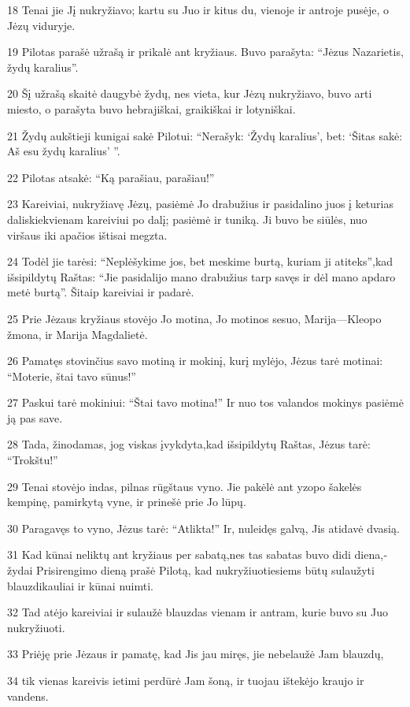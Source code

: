 \par 18 Tenai jie Jį nukryžiavo; kartu su Juo ir kitus du, vienoje ir antroje pusėje, o Jėzų viduryje. 
\par 19 Pilotas parašė užrašą ir prikalė ant kryžiaus. Buvo parašyta: “Jėzus Nazarietis, žydų karalius”. 
\par 20 Šį užrašą skaitė daugybė žydų, nes vieta, kur Jėzų nukryžiavo, buvo arti miesto, o parašyta buvo hebrajiškai, graikiškai ir lotyniškai. 
\par 21 Žydų aukštieji kunigai sakė Pilotui: “Nerašyk: ‘Žydų karalius’, bet: ‘Šitas sakė: Aš esu žydų karalius’ ”. 
\par 22 Pilotas atsakė: “Ką parašiau, parašiau!” 
\par 23 Kareiviai, nukryžiavę Jėzų, pasiėmė Jo drabužius ir pasidalino juos į keturias dalis­kiekvienam kareiviui po dalį; pasiėmė ir tuniką. Ji buvo be siūlės, nuo viršaus iki apačios ištisai megzta. 
\par 24 Todėl jie tarėsi: “Neplėšykime jos, bet meskime burtą, kuriam ji atiteks”,­kad išsipildytų Raštas: “Jie pasidalijo mano drabužius tarp savęs ir dėl mano apdaro metė burtą”. Šitaip kareiviai ir padarė. 
\par 25 Prie Jėzaus kryžiaus stovėjo Jo motina, Jo motinos sesuo, Marija—Kleopo žmona, ir Marija Magdalietė. 
\par 26 Pamatęs stovinčius savo motiną ir mokinį, kurį mylėjo, Jėzus tarė motinai: “Moterie, štai tavo sūnus!” 
\par 27 Paskui tarė mokiniui: “Štai tavo motina!” Ir nuo tos valandos mokinys pasiėmė ją pas save. 
\par 28 Tada, žinodamas, jog viskas įvykdyta,­kad išsipildytų Raštas, Jėzus tarė: “Trokštu!” 
\par 29 Tenai stovėjo indas, pilnas rūgštaus vyno. Jie pakėlė ant yzopo šakelės kempinę, pamirkytą vyne, ir prinešė prie Jo lūpų. 
\par 30 Paragavęs to vyno, Jėzus tarė: “Atlikta!” Ir, nuleidęs galvą, Jis atidavė dvasią. 
\par 31 Kad kūnai neliktų ant kryžiaus per sabatą,­nes tas sabatas buvo didi diena,­žydai Prisirengimo dieną prašė Pilotą, kad nukryžiuotiesiems būtų sulaužyti blauzdikauliai ir kūnai nuimti. 
\par 32 Tad atėjo kareiviai ir sulaužė blauzdas vienam ir antram, kurie buvo su Juo nukryžiuoti. 
\par 33 Priėję prie Jėzaus ir pamatę, kad Jis jau miręs, jie nebelaužė Jam blauzdų, 
\par 34 tik vienas kareivis ietimi perdūrė Jam šoną, ir tuojau ištekėjo kraujo ir vandens. 
